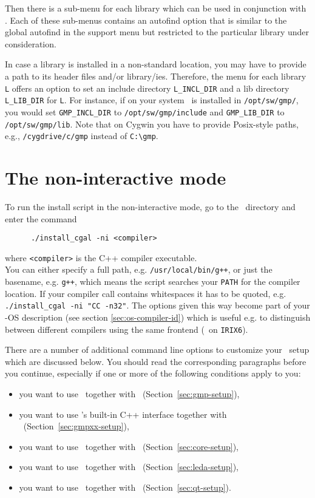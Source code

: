 Then there is a sub-menu for each library which can be used in
conjunction with \cgal. Each of these sub-menus contains an autofind
option that is similar to the global autofind in the support menu but
restricted to the particular library under consideration.

In case a library is installed in a non-standard location, you may
have to provide a path to its header files and/or library/ies.
Therefore, the menu for each library \texttt{L} offers an option to
set an include directory \texttt{L\_INCL\_DIR} and a lib directory
\texttt{L\_LIB\_DIR} for \texttt{L}. For instance, if on your system
\gmp\ is installed in \texttt{/opt/sw/gmp/}, you would set
\texttt{GMP\_INCL\_DIR} to \texttt{/opt/sw/gmp/include} and
\texttt{GMP\_LIB\_DIR} to \texttt{/opt/sw/gmp/lib}. Note that on
Cygwin you have to provide Posix-style paths, e.g.,
\texttt{/cygdrive/c/gmp} instead of \verb|C:\gmp|.

\section{The non-interactive mode}\label{sec:non-interactive}

To run the install script in the non-interactive mode, go to the
\cgaldir\ directory and enter the command
\begin{verbatim}
      ./install_cgal -ni <compiler>
\end{verbatim}
where \texttt{<compiler>} is the C++ compiler
executable.\\ You can either specify a full
path, e.g. \texttt{/usr/local/bin/g++}, or just the basename, e.g.
\texttt{g++}, which means the script searches your \texttt{PATH} for
the compiler location. If your compiler call contains whitespaces it
has to be quoted, e.g.  \texttt{./install\_cgal -ni "CC -n32"}.  The
options given this way become part of your \cgal-OS
description (see section
\ref{sec:os-compiler-id}) which is useful e.g. to distinguish between
different compilers using the same frontend (\mipsprocc\ on
\texttt{IRIX6}).

There are a number of additional command line options to customize
your \cgal\ setup which are discussed below. You should read the
corresponding paragraphs before you continue, especially if one or
more of the following conditions apply to you:
\begin{itemize}
\item you want to use \gmp\ together with \cgal\ 
  (Section~\ref{sec:gmp-setup}),
\item you want to use \gmp's built-in C++ interface together with
  \cgal\ (Section~\ref{sec:gmpxx-setup}),
\item you want to use \core\ together with \cgal\ 
  (Section~\ref{sec:core-setup}),
\item you want to use \leda\ together with \cgal\ 
  (Section~\ref{sec:leda-setup}),
\item you want to use \qt\ together with \cgal\ 
  (Section~\ref{sec:qt-setup}).
\end{itemize}

